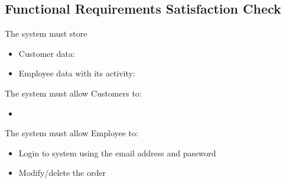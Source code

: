 \subsection{Functional Requirements Satisfaction Check}

The system must store
\begin{itemize}
	\item Customer data:
\end{itemize}
\begin{itemize}
	\item Employee data with its activity:
\end{itemize}

The system must allow Customers to:
\begin{itemize}
	\item
\end{itemize}

The system must allow Employee to:
\begin{itemize}
	\item Login to system using the email address and password
	\item Modify/delete the order
\end{itemize}